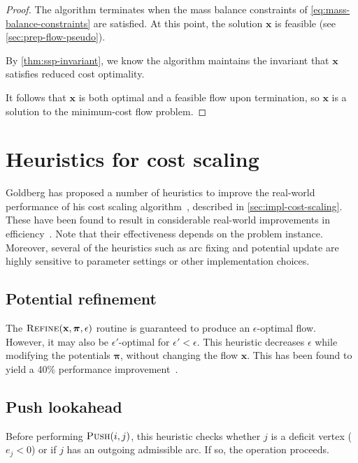 \sspcorrectness*
\begin{proof}
    The algorithm terminates when the mass balance constraints of \cref{eq:mass-balance-constraints} are satisfied. At this point, the solution $\mathbf{x}$ is feasible (see \cref{sec:prep-flow-pseudo}). 
    
    By \cref{thm:ssp-invariant}, we know the algorithm maintains the invariant that $\mathbf{x}$ satisfies reduced cost optimality. 
    
    It follows that $\mathbf{x}$ is both optimal and a feasible flow upon termination, so $\mathbf{x}$ is a solution to the minimum-cost flow problem.
\end{proof}

\section{Heuristics for cost scaling} \label{appendix:impl-csheuristics}
Goldberg has proposed a number of heuristics to improve the real-world performance of his cost scaling algorithm~\cite{Goldberg:1997}, described in \cref{sec:impl-cost-scaling}. These have been found to result in considerable real-world improvements in efficiency~\cite{Bunnagel:1998,KiralyKovacs:2012}. Note that their effectiveness depends on the problem instance. Moreover, several of the heuristics such as arc fixing and potential update are highly sensitive to parameter settings or other implementation choices.

\subsection{Potential refinement} \label{appendix:impl-csheuristics-potential-refinement}
The $\textproc{Refine}(\mathbf{x},\boldsymbol{\pi},\epsilon)$ routine is guaranteed to produce an $\epsilon$-optimal flow. However, it may also be $\epsilon'$-optimal for $\epsilon' < \epsilon$. This heuristic decreases $\epsilon$ while modifying the potentials $\boldsymbol{\pi}$, without changing the flow $\mathbf{x}$. This has been found to yield a 40\% performance improvement~\cite{Bunnagel:1998}.

\subsection{Push lookahead}
Before performing $\textproc{Push}(i,j)$, this heuristic checks whether $j$ is a deficit vertex ($e_j < 0$) or if $j$ has an outgoing admissible arc. If so, the  operation proceeds.

